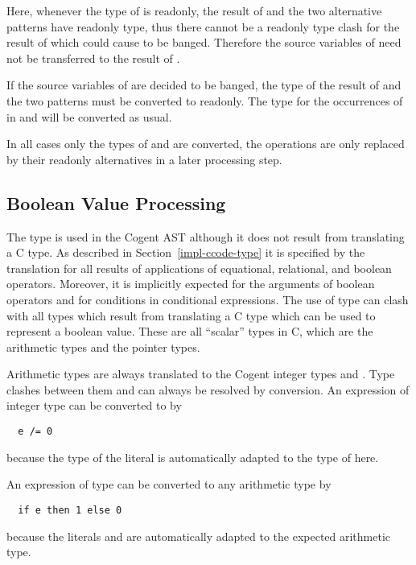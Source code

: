 Here, whenever the type of  is readonly, the result of  and the two alternative patterns have readonly type,
thus there cannot be a readonly type clash for the result of  which could cause  to be banged. Therefore
the source variables of  need not be transferred to the result of .

If the source variables of  are decided to be banged, the type of the result of  and the two patterns must
be converted to readonly. The type for the occurrences of  in  and  will be converted as usual.

In all cases only the types of  and  are converted, the operations are only replaced by their readonly
alternatives in a later processing step.

\subsection{Boolean Value Processing}
\label{impl-post-bool}

The type  is used in the Cogent AST although it does not result from translating a C type. As described in
Section~\ref{impl-ccode-type} it is specified by the translation for all results of applications of equational, relational,
and boolean operators. Moreover, it is implicitly expected for the arguments of boolean operators and for conditions in conditional
expressions. The use of type  can clash with all types which result from translating a C type which can be used to
represent a boolean value. These are all ``scalar'' types in C, which are the arithmetic types and the pointer types.

Arithmetic types are always translated to the Cogent integer types  and . Type clashes between
them and  can always be resolved by conversion. An expression  of integer type can be converted
to  by
\begin{verbatim}
  e /= 0
\end{verbatim}
because the type of the literal  is automatically adapted to the type of  here.

An expression  of type  can be converted to any arithmetic type by
\begin{verbatim}
  if e then 1 else 0
\end{verbatim}
because the literals  and  are automatically adapted to the expected arithmetic type.

